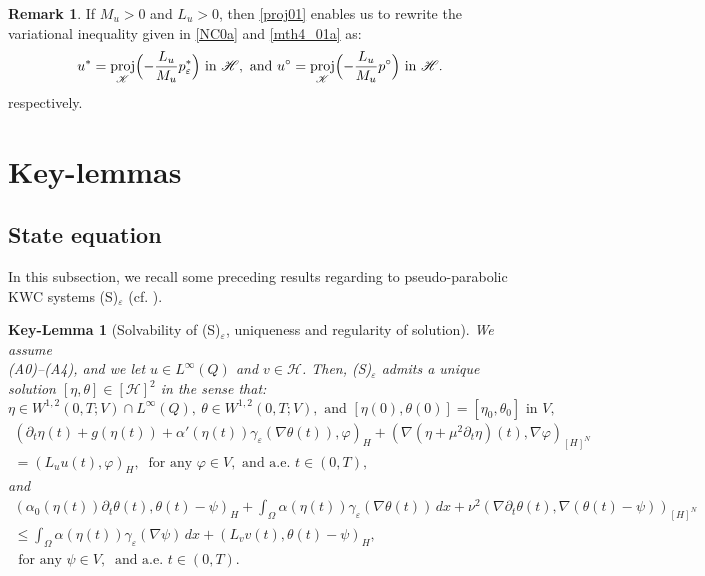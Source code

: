 \documentclass{sinst}
\numberwithin{equation}{section}
\theoremstyle{plain}
\newtheorem{keylem}{Key-Lemma}
\theoremstyle{definition}
\newtheorem{rem}{Remark}
\def\sH{\mathscr{H}}
\def\sK{\mathscr{K}}
\DeclareMathOperator{\proj}{proj}
\begin{document}
\begin{rem}
  If $M_u > 0$ and $L_u > 0$, then \eqref{proj01} enables us to rewrite the variational inequality given in \eqref{NC0a} and \eqref{mth4_01a} as:
  \begin{equation}
    u^* = \proj_\sK\Bigl(- \frac{L_u}{M_u}p_\varepsilon^* \Bigr) \mbox{ in } \sH, \mbox{ and } u^\circ = \proj_\sK\Bigl(-\frac{L_u}{M_u} p^\circ \Bigr) \mbox{ in } \sH.
  \end{equation}
  respectively.
\end{rem}

\section{Key-lemmas}

\subsection{State equation}
In this subsection, we recall some preceding results regarding to pseudo-parabolic KWC systems (S)$_\varepsilon$ (cf. \cite{MR4797677,mizuno2024weak}).

\begin{keylem}[Solvability of (S)$_\varepsilon$, uniqueness and regularity of solution] \label{lem:solvability}
  We assume \\
  (A0)--(A4), and we let $u \in L^\infty(Q)$ and $v \in \sH$. Then, (S)$_\varepsilon$ admits a unique solution $[\eta, \theta] \in [\sH]^2$ in the sense that:
  \begin{equation}
    \eta \in W^{1,2}(0,T;V) \cap L^\infty(Q), \ \theta \in W^{1,2}(0,T;V), \mbox{ and } [\eta(0), \theta(0)] = [\eta_0, \theta_0] \mbox{ in } V,
  \end{equation}
  \begin{gather}
    (\partial_t \eta(t) + g(\eta(t)) + \alpha'(\eta(t)) \gamma_\varepsilon(\nabla \theta(t)), \varphi)_H + (\nabla (\eta + \mu^2 \partial_t \eta)(t), \nabla \varphi)_{[H]^N} 
    \\
    = (L_u u(t), \varphi)_H, \ \mbox{ for any } \varphi \in V, \mbox{ and a.e. } t \in (0,T), \label{(S)1st_VI}
  \end{gather}
  and
  \begin{gather}
    (\alpha_0(\eta(t))\partial_t \theta(t), \theta(t) - \psi)_H + \int_\Omega \alpha(\eta(t)) \gamma_\varepsilon(\nabla \theta(t))\,dx + \nu^2 (\nabla \partial_t \theta(t), \nabla (\theta(t) - \psi))_{[H]^N}
    \\
    \leq \int_\Omega \alpha(\eta(t)) \gamma_\varepsilon(\nabla \psi) \,dx + (L_v v(t), \theta(t) - \psi)_H, \label{(S)2nd_VI}
    \\
    \mbox{ for any } \psi \in V, \ \mbox{ and a.e. } t \in (0,T).
  \end{gather}
\end{keylem}
\end{document}
